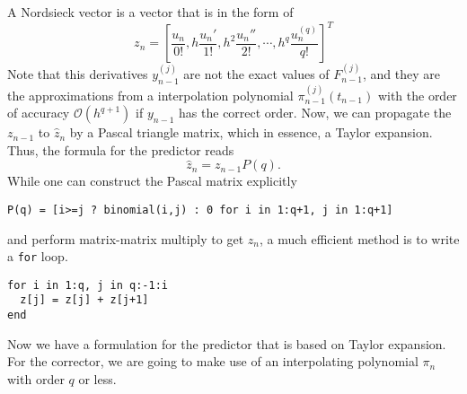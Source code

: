\documentclass[11pt,a4paper]{article}
\begin{document}
A Nordsieck vector is a vector that is in the form of
\begin{equation}
  z_n = \left[\frac{u_n}{0!}, h\frac{u_n'}{1!}, h^2\frac{u_n''}{2!},
  \cdots, h^q\frac{u_n^{(q)}}{q!}\right]^T
\end{equation}
Note that this derivatives $y_{n-1}^{(j)}$ are not the exact values of
$F^{(j)}_{n-1}$, and they are the approximations from a interpolation
polynomial $\pi_{n-1}^{(j)}(t_{n-1})$ with the order of accuracy
$\mathcal{O}(h^{q+1})$ if $y_{n-1}$ has the correct order. Now, we can
propagate the $z_{n-1}$ to $\hat{z}_{n}$ by a Pascal triangle matrix, which in
essence, a Taylor expansion. Thus, the formula for the predictor reads
\begin{equation}
  \hat{z}_n = z_{n-1}P(q).
\end{equation}
While one can construct the Pascal matrix explicitly
\begin{lstlisting}
P(q) = [i>=j ? binomial(i,j) : 0 for i in 1:q+1, j in 1:q+1]
\end{lstlisting}
and perform matrix-matrix multiply to get $z_n$, a much efficient method is to
write a \texttt{for} loop.
\begin{lstlisting}
for i in 1:q, j in q:-1:i
  z[j] = z[j] + z[j+1]
end
\end{lstlisting}

Now we have a formulation for the predictor that is based on Taylor expansion.
For the corrector, we are going to make use of an interpolating polynomial
$\pi_{n}$ with order $q$ or less.

\end{document}
